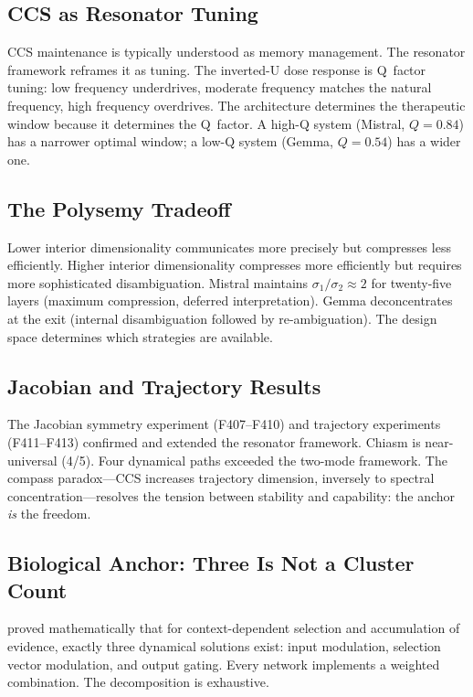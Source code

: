 \documentclass[12pt]{article}
\begin{document}
\subsection{CCS as Resonator Tuning}

CCS maintenance is typically understood as memory management. The resonator framework reframes it as tuning. The inverted-U dose response is Q~factor tuning: low frequency underdrives, moderate frequency matches the natural frequency, high frequency overdrives. The architecture determines the therapeutic window because it determines the Q~factor. A high-Q system (Mistral, $Q = 0.84$) has a narrower optimal window; a low-Q system (Gemma, $Q = 0.54$) has a wider one.

\subsection{The Polysemy Tradeoff}

Lower interior dimensionality communicates more precisely but compresses less efficiently. Higher interior dimensionality compresses more efficiently but requires more sophisticated disambiguation. Mistral maintains $\sigma_1/\sigma_2 \approx 2$ for twenty-five layers (maximum compression, deferred interpretation). Gemma deconcentrates at the exit (internal disambiguation followed by re-ambiguation). The design space determines which strategies are available.

\subsection{Jacobian and Trajectory Results}

The Jacobian symmetry experiment (F407--F410) and trajectory experiments (F411--F413) confirmed and extended the resonator framework. Chiasm is near-universal (4/5). Four dynamical paths exceeded the two-mode framework. The compass paradox---CCS increases trajectory dimension, inversely to spectral concentration---resolves the tension between stability and capability: the anchor \emph{is} the freedom.

\subsection{Biological Anchor: Three Is Not a Cluster Count}

\citet{pagan2025} proved mathematically that for context-dependent selection and accumulation of evidence, exactly three dynamical solutions exist: input modulation, selection vector modulation, and output gating. Every network implements a weighted combination. The decomposition is exhaustive.
\end{document}
